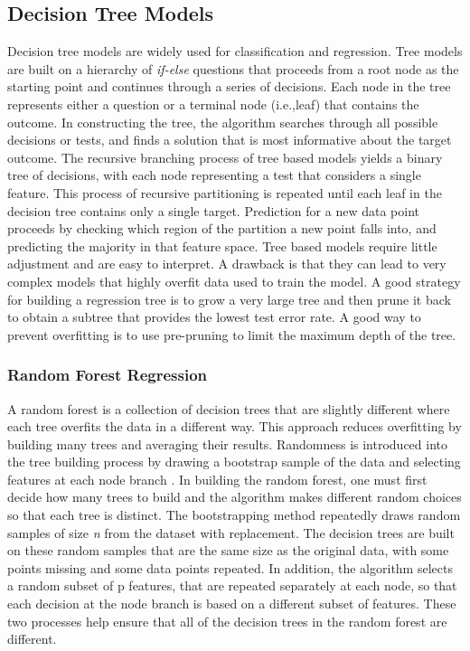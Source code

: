 \documentclass[sigconf]{acmart}
\begin{document}

\subsection{Decision Tree Models}

Decision tree models are widely used for classification and regression. Tree 
models are built on a hierarchy of \textit{if-else} questions that proceeds 
from a root node as the starting point and continues through a series of 
decisions. Each node in the tree represents either a question or a terminal 
node (i.e.,leaf) that contains the outcome. In constructing the tree, the 
algorithm searches through all possible decisions or tests, and finds a 
solution that is most informative about the target outcome. The recursive 
branching process of tree based models yields a binary tree of decisions, 
with each node representing a test that considers a single feature. This 
process of recursive partitioning is repeated until each leaf in the decision 
tree contains only a single target. Prediction for a new data point proceeds 
by checking which region of the partition a new point falls into, and 
predicting the majority in that feature space. Tree based models require 
little adjustment and are easy to interpret. A drawback is that they can lead 
to very complex models that highly overfit data used to train the model. A 
good strategy for building a regression tree is to grow a very large tree 
and then prune it back to obtain a subtree that provides the lowest test error 
rate. A good way to prevent overfitting is to use pre-pruning to limit 
the maximum depth of the tree. 

\subsubsection{Random Forest Regression}

A random forest is a collection of decision trees that are slightly different 
where each tree overfits the data in a different way. This approach reduces 
overfitting by building many trees and averaging their results. Randomness is 
introduced into the tree building process by drawing a bootstrap sample of the 
data and selecting features at each node branch \cite{muller17,raschka17}. 
In building the random forest, one must first decide how many trees to build  
and the algorithm makes different random choices so that each tree is distinct. 
The bootstrapping method repeatedly draws random samples of size \textit{n} 
from the dataset with replacement. The decision trees are built on these 
random samples that are the same size as the original data, with some points 
missing and some data points repeated. In addition, the algorithm selects a 
random subset of p features, that are repeated separately at each node, so 
that each decision at the node branch is based on a different subset of 
features. These two processes help ensure that all of the decision trees in 
the random forest are different. 
\end{document}
